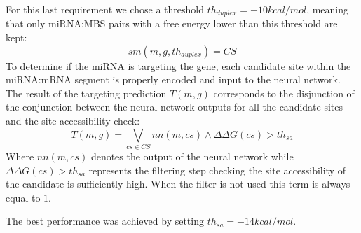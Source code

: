 For this last requirement we chose a threshold $th_{duplex} = -10kcal/mol$, meaning that only miRNA:MBS pairs with a free energy lower than this threshold are kept:
%
\begin{equation} \label{eq:eq1}
	sm(m,g, th_{duplex}) = CS
\end{equation}
To determine if the miRNA is targeting the gene, each candidate site within the miRNA:mRNA segment is properly encoded and input to the neural network. The result of the targeting prediction $T(m, g)$ corresponds to the disjunction of the conjunction between the neural network outputs for all the candidate sites and the site accessibility check:
%
\begin{equation} \label{eq:eq2}
	T(m,g) = \bigvee_{cs\in CS}{nn(m,cs) \wedge \Delta\Delta G(cs) > th_{sa}}
\end{equation} 
%
Where $nn(m,cs)$ denotes the output of the neural network while $\Delta\Delta G(cs) > th_{sa}$ represents the filtering step checking the site accessibility of the candidate is sufficiently high. When the filter is not used this term is always equal to $1$.

The best performance was achieved by setting $th_{sa} = -14kcal/mol$.



